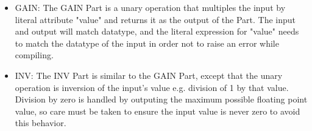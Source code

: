\begin{itemize}[label={}]
    \item GAIN:
The GAIN Part is a unary operation that multiples the input by literal attribute "value" and returns it as the output of the Part.
The input and output will match datatype, and the literal expression for "value" needs to match the datatype of the input in order not to raise an error while compiling.
    \item INV:
The INV Part is similar to the GAIN Part, except that the unary operation is inversion of the input's value e.g. division of 1 by that value.
Division by zero is handled by outputing the maximum possible floating point value, so care must be taken to ensure the input value is never zero to avoid this behavior.
\end{itemize}
